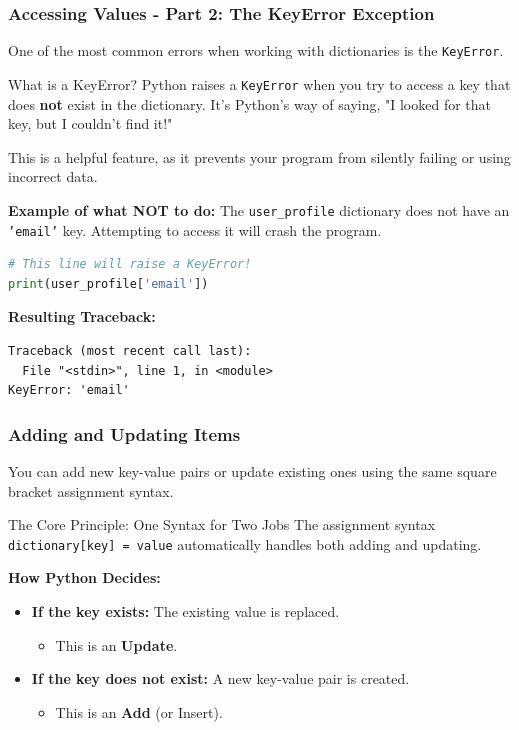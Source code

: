 \documentclass{beamer}
\begin{document}
\begin{frame}[fragile]
    \frametitle{Accessing Values - Part 2: The KeyError Exception}

    One of the most common errors when working with dictionaries is the \texttt{KeyError}.

    \begin{block}{What is a KeyError?}
        Python raises a \texttt{KeyError} when you try to access a key that does \textbf{not} exist in the dictionary. It's Python's way of saying, "I looked for that key, but I couldn't find it!"
        \vspace{0.5em}
        
        This is a helpful feature, as it prevents your program from silently failing or using incorrect data.
    \end{block}

    \textbf{Example of what NOT to do:}
    The \texttt{user\_profile} dictionary does not have an \texttt{'email'} key. Attempting to access it will crash the program.

    \begin{lstlisting}[language=Python]
# This line will raise a KeyError!
print(user_profile['email'])
    \end{lstlisting}

    \textbf{Resulting Traceback:}
    \begin{verbatim}
Traceback (most recent call last):
  File "<stdin>", line 1, in <module>
KeyError: 'email'
    \end{verbatim}
\end{frame}

\begin{frame}[fragile]
    \frametitle{Adding and Updating Items}
    \subtitle{The "Upsert" Operation}
    
    You can add new key-value pairs or update existing ones using the same square bracket assignment syntax.
    
    \begin{block}{The Core Principle: One Syntax for Two Jobs}
        The assignment syntax \texttt{dictionary[key] = value} automatically handles both adding and updating.
    \end{block}
    
    \vfill
    
    \textbf{How Python Decides:}
    \begin{itemize}
        \item \textbf{If the key exists:} The existing value is replaced.
        \begin{itemize}
            \item This is an \textbf{Update}.
        \end{itemize}
        \item \textbf{If the key does not exist:} A new key-value pair is created.
        \begin{itemize}
            \item This is an \textbf{Add} (or Insert).
        \end{itemize}
    \end{itemize}
    
\end{frame}
\end{document}
